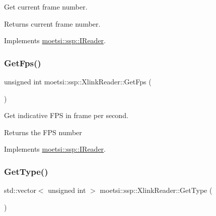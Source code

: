 Get current frame number. 

\begin{DoxyReturn}{Returns}
current frame number. 
\end{DoxyReturn}


Implements \hyperlink{classmoetsi_1_1ssp_1_1IReader_ac292d83eb06dee277baaa06e281a562d}{moetsi\+::ssp\+::\+I\+Reader}.

\mbox{\label{classmoetsi_1_1ssp_1_1XlinkReader_accfec6799b561107f27240e5324aa5d4}} 
\subsubsection{\texorpdfstring{Get\+Fps()}{GetFps()}}
{\footnotesize\ttfamily unsigned int moetsi\+::ssp\+::\+Xlink\+Reader\+::\+Get\+Fps (\begin{DoxyParamCaption}{ }\end{DoxyParamCaption})\hspace{0.3cm}{\ttfamily [virtual]}}



Get indicative F\+PS in frame per second. 

\begin{DoxyReturn}{Returns}
the F\+PS number 
\end{DoxyReturn}


Implements \hyperlink{classmoetsi_1_1ssp_1_1IReader_a9f6a8650ca290b011b8e5451eeae9f32}{moetsi\+::ssp\+::\+I\+Reader}.

\mbox{\label{classmoetsi_1_1ssp_1_1XlinkReader_a2119c9bc9e4929ff37115a7be463eb92}} 
\subsubsection{\texorpdfstring{Get\+Type()}{GetType()}}
{\footnotesize\ttfamily std\+::vector$<$ unsigned int $>$ moetsi\+::ssp\+::\+Xlink\+Reader\+::\+Get\+Type (\begin{DoxyParamCaption}{ }\end{DoxyParamCaption})\hspace{0.3cm}{\ttfamily [virtual]}}



